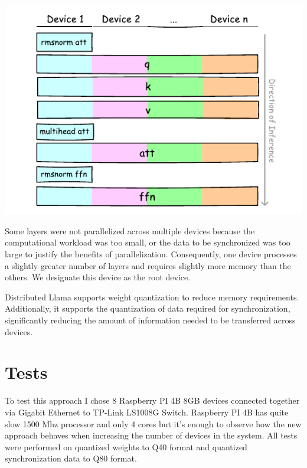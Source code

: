 \documentclass{article}
\newenvironment{Figure}
  {\par\medskip\noindent\minipage{\linewidth}}
  {\endminipage\par\medskip}
\begin{document}
\begin{multicols}{2}
\begin{Figure}
  \centering
  \includegraphics[width=\linewidth]{fig2.pdf}
\end{Figure}

Some layers were not parallelized across multiple devices because the computational workload was too small, or the data to be synchronized was too large to justify the benefits of parallelization. Consequently, one device processes a slightly greater number of layers and requires slightly more memory than the others. We designate this device as the root device.

Distributed Llama supports weight quantization to reduce memory requirements. Additionally, it supports the quantization of data required for synchronization, significantly reducing the amount of information needed to be transferred across devices.

\section{Tests}

To test this approach I chose 8 Raspberry PI 4B 8GB devices connected together via Gigabit Ethernet to TP-Link LS1008G Switch. Raspberry PI 4B has quite slow 1500 Mhz processor and only 4 cores but it’s enough to observe how the new approach behaves when increasing the number of devices in the system. All tests were performed on quantized weights to Q40 format and quantized synchronization data to Q80 format.

\end{multicols}
\end{document}
